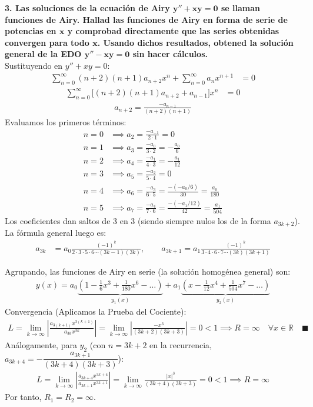 \documentclass[11pt, a4paper]{article}
\begin{document}
\noindent\textbf{3. Las soluciones de la ecuación de Airy $\bm{y''+xy=0}$ se llaman funciones de Airy. Hallad las funciones de Airy en forma de serie de potencias en $\bm{x}$ y comprobad directamente que las series obtenidas convergen para todo $\bm{x}$. Usando dichos resultados, obtened la solución general de la EDO $\bm{y''-xy=0}$ sin hacer cálculos.} \\
Sustituyendo en $y''+xy=0$:
\begin{align*}
\sum_{n=0}^{\infty} (n+2)(n+1)a_{n+2} x^n + \sum_{n=0}^{\infty} a_n x^{n+1} &= 0
\end{align*}
\begin{align*}
\sum_{n=0}^{\infty} \big[ (n+2)(n+1)a_{n+2} + a_{n-1} \big] x^n &= 0
\end{align*}
\begin{align*}
a_{n+2} = \frac{-a_{n-1}}{(n+2)(n+1)}
\end{align*}
Evaluamos los primeros términos:
\begin{align*}
n=0 &\implies a_2 = \frac{-a_{-1}}{2\cdot 1} = 0 \\
n=1 &\implies a_3 = \frac{-a_0}{3\cdot 2} = -\frac{a_0}{6} \\
n=2 &\implies a_4 = \frac{-a_1}{4\cdot 3} = -\frac{a_1}{12} \\
n=3 &\implies a_5 = \frac{-a_2}{5\cdot 4} = 0 \\
n=4 &\implies a_6 = \frac{-a_3}{6\cdot 5} = \frac{-(-a_0/6)}{30} = \frac{a_0}{180} \\
n=5 &\implies a_7 = \frac{-a_4}{7\cdot 6} = \frac{-(-a_1/12)}{42} = \frac{a_1}{504}
\end{align*}
Los coeficientes dan saltos de 3 en 3 (siendo siempre nulos los de la forma $a_{3k+2}$). La fórmula general luego es:
\begin{align*}
a_{3k} &= a_0 \frac{(-1)^k}{2\cdot 3 \cdot 5\cdot 6 \cdots (3k-1)(3k)}, \qquad a_{3k+1} = a_1 \frac{(-1)^k}{3\cdot 4 \cdot 6\cdot 7 \cdots (3k)(3k+1)}
\end{align*}

Agrupando, las funciones de Airy en serie (la solución homogénea general) son:
\begin{align*}
y(x) = a_0\underbrace{\left(1 - \frac{1}{6}x^3 + \frac{1}{180}x^6 - \dots\right)}_{y_1(x)} + a_1\underbrace{\left(x - \frac{1}{12}x^4 + \frac{1}{504}x^7 - \dots\right)}_{y_2(x)}
\end{align*}
Convergencia (Aplicamos la Prueba del Cociente): 
\begin{align*}
L = \lim_{k\to\infty} \left| \frac{a_{3(k+1)}x^{3(k+1)}}{a_{3k}x^{3k}} \right| = \lim_{k\to\infty} \left| \frac{-x^3}{(3k+2)(3k+3)} \right| = 0 < 1 \implies R = \infty \quad \forall x \in \mathbb{R} \quad \blacksquare
\end{align*}
Análogamente, para $y_2$ (con $n=3k+2$ en la recurrencia, $a_{3k+4}=-\dfrac{a_{3k+1}}{(3k+4)(3k+3)}$):
\begin{align*}
L = \lim_{k\to\infty} \left| \frac{a_{3k+4}x^{3k+4}}{a_{3k+1}x^{3k+1}} \right| = \lim_{k\to\infty} \frac{|x|^3}{(3k+4)(3k+3)} = 0 < 1 \implies R = \infty
\end{align*}
Por tanto, $R_1=R_2=\infty$.
\end{document}
